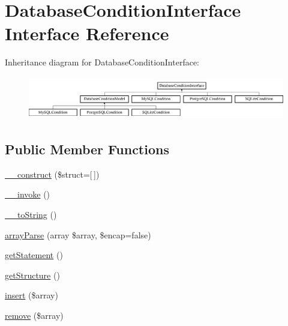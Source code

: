 \hypertarget{interface_database_condition_interface}{}\section{Database\+Condition\+Interface Interface Reference}
\label{interface_database_condition_interface}
Inheritance diagram for Database\+Condition\+Interface\+:\begin{figure}[H]
\begin{center}
\leavevmode
\includegraphics[height=1.909091cm]{interface_database_condition_interface}
\end{center}
\end{figure}
\subsection*{Public Member Functions}
\begin{DoxyCompactItemize}
\item 
\hyperlink{interface_database_condition_interface_aeb576c3b33394f5ab4f37c7e64d44502}{\+\_\+\+\_\+construct} (\$struct=\mbox{[}$\,$\mbox{]})
\item 
\hyperlink{interface_database_condition_interface_a9aac7e1475efe923de4e19cc2511f092}{\+\_\+\+\_\+invoke} ()
\item 
\hyperlink{interface_database_condition_interface_a7516ca30af0db3cdbf9a7739b48ce91d}{\+\_\+\+\_\+to\+String} ()
\item 
\hyperlink{interface_database_condition_interface_a8fe63e52baa6d003a96482ee5068abe5}{array\+Parse} (array \$array, \$encap=false)
\item 
\hyperlink{interface_database_condition_interface_a71922b66dbbd931e3bd73bd0b8c6bc0f}{get\+Statement} ()
\item 
\hyperlink{interface_database_condition_interface_ac039a7d66b72b41cbc80f4507d254f68}{get\+Structure} ()
\item 
\hyperlink{interface_database_condition_interface_a0746ee466ee9178068496aa443ed9189}{insert} (\$array)
\item 
\hyperlink{interface_database_condition_interface_a170962f6550bf5cefcf4a871dcebc25e}{remove} (\$array)
\end{DoxyCompactItemize}


